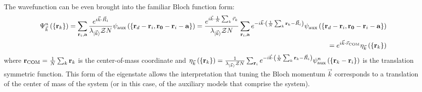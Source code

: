 \documentclass[reprint,hidelinks,onecolumn]{revtex4-2}
\begin{document}
The wavefunction can be even brought into the familiar Bloch function form:
\begin{equation}\begin{aligned}
	\Psi^n_{\vec k}\left(\left\{{\bf r}_k\right\}\right) = \sum_{{\bf r}_i, {\bf a}} \frac{e^{i \vec{k}\cdot\vec{R}_i}}{\lambda_{\ket{\vec k}} \mathcal{Z} N} \psi_\text{aux}\left(\left\{ {\bf r}_d - {\bf r}_i, {\bf r_0} - {\bf r}_i - {\bf a} \right\} \right) = \frac{e^{i \vec{k}\cdot\frac{1}{N}\sum_k \vec{r}_k}}{\lambda_{\ket{\vec k}} \mathcal{Z} N}\sum_{{\bf r}_i, {\bf a}} e^{-i \vec{k}\cdot\left(\frac{1}{N}\sum_k{\bf r}_k - \vec{R}_i\right)} \psi_\text{aux}\left(\left\{ {\bf r}_d - {\bf r}_i, {\bf r_0} - {\bf r}_i - {\bf a} \right\} \right) \\
	= e^{i \vec{k}\cdot\vec{r}_\text{COM}} \eta_{\vec k}\left(\left\{{\bf r}_k\right\}\right)
\end{aligned}\end{equation}
where \({\bf r}_\text{COM} = \frac{1}{N}\sum_k {\bf r}_k\) is the center-of-mass coordinate and \(\eta_{\vec k}\left(\left\{{\bf r}_k\right\}\right) = \frac{1}{\lambda_{\ket{\vec k}} \mathcal{Z} N}\sum_{{\bf r}_i} e^{-i \vec{k}\cdot\left(\frac{1}{N}\sum_k{\bf r}_k - \vec{R}_i\right)} \psi^n_\text{aux}\left(\left\{{\bf r}_k - {\bf r}_i\right\}\right)\) is the translation symmetric function. This form of the eigenstate allows the interpretation that tuning the Bloch momentum \(\vec k\) corresponds to a translation of the center of mass of the system (or in this case, of the auxiliary models that comprise the system).
\end{document}
